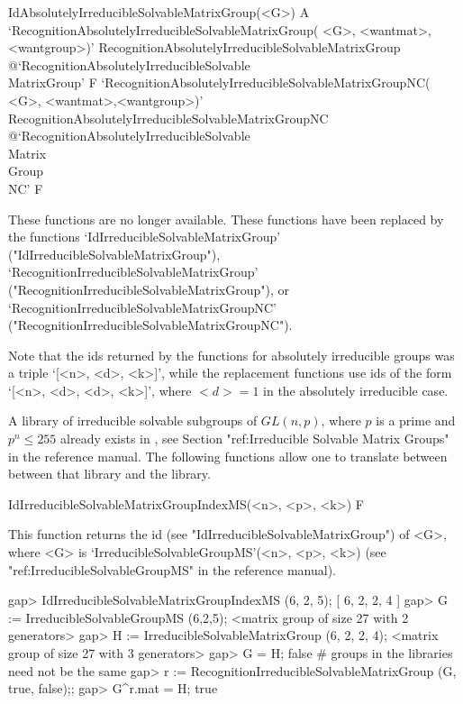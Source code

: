 \>IdAbsolutelyIrreducibleSolvableMatrixGroup(<G>) A
\>`RecognitionAbsolutelyIrreducibleSolvableMatrixGroup(%
   <G>, <wantmat>, <wantgroup>)'%
{RecognitionAbsolutelyIrreducibleSolvableMatrixGroup}%
@{`RecognitionAbsolutelyIrreducibleSolvable\\MatrixGroup'} F
\>`RecognitionAbsolutelyIrreducibleSolvableMatrixGroupNC(%
   <G>, <wantmat>,<wantgroup>)'%
{RecognitionAbsolutelyIrreducibleSolvableMatrixGroupNC}%
@{`RecognitionAbsolutelyIrreducibleSolvable\\Matrix\\Group\\NC'} F

These functions are no longer available. These functions have been replaced by the
functions 
`IdIrreducibleSolvableMatrixGroup' ("IdIrreducibleSolvableMatrixGroup"), 
`RecognitionIrreducibleSolvableMatrixGroup' ("RecognitionIrreducibleSolvableMatrixGroup"), or
`Recognition\-Irre\-du\-ci\-bleSolvableMatrixGroupNC' ("RecognitionIrreducibleSolvableMatrixGroupNC").

Note that the ids returned by the functions for absolutely irreducible groups was a triple `[<n>, <d>, <k>]', while the replacement functions use ids of the form `[<n>, <d>, <d>, <k>]', where $<d> = 1$ in the absolutely irreducible case.



A library of irreducible solvable subgroups of $GL(n, p)$, where $p$ is a 
prime and $p^n \leq 255$ already exists in {\GAP}, see Section "ref:Irreducible Solvable Matrix Groups" in the {\GAP} reference manual. The following functions
allow one to translate between between that library and the {\IRREDSOL} library. 


\>IdIrreducibleSolvableMatrixGroupIndexMS(<n>, <p>, <k>) F

This function returns the id (see "IdIrreducibleSolvableMatrixGroup") of <G>, 
where <G> is `IrreducibleSolvableGroupMS'(<n>, <p>, <k>) (see "ref:IrreducibleSolvableGroupMS" in the {\GAP} reference manual).

\beginexample
gap> IdIrreducibleSolvableMatrixGroupIndexMS (6, 2, 5);
[ 6, 2, 2, 4 ]
gap> G := IrreducibleSolvableGroupMS (6,2,5);
<matrix group of size 27 with 2 generators>
gap> H := IrreducibleSolvableMatrixGroup (6, 2, 2, 4);
<matrix group of size 27 with 3 generators>
gap> G = H;
false 
# groups in the libraries need not be the same
gap> r := RecognitionIrreducibleSolvableMatrixGroup (G, true, false);;
gap> G^r.mat = H;
true
\endexample

